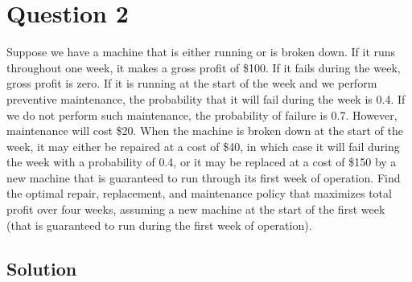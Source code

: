 \section*{Question 2}

Suppose we have a machine that is either running or is broken down.
If it runs throughout one week, it makes a gross profit of \$100.
If it fails during the week, gross profit is zero.
If it is running at the start of the week and we perform preventive maintenance, the probability that it will fail during the week is 0.4.
If we do not perform such maintenance, the probability of failure is 0.7.
However, maintenance will cost \$20.
When the machine is broken down at the start of the week, it may either be repaired at a cost of \$40, in which case it will fail during the week with a probability of 0.4, or it may be replaced at a cost of \$150 by a new machine that is guaranteed to run through its first week of operation.
Find the optimal repair, replacement, and maintenance policy that maximizes total profit over four weeks, assuming a new machine at the start of the first week (that is guaranteed to run during the first week of operation).

\subsection*{Solution}
